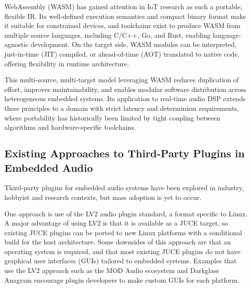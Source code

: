 \documentclass[a4paper]{article}
\begin{document}
WebAssembly (WASM) has gained attention in IoT research as such a portable, flexible IR\cite{10.1007/978-3-030-74296-6_27}\cite{10.1145/3593434.3593454}\cite{Rusum_2022}. Its well-defined execution semantics and compact binary format make it suitable for constrained devices, and toolchains exist to produce WASM from multiple source languages, including C/C++, Go, and Rust, enabling language-agnostic development. On the target side, WASM modules can be interpreted, just-in-time (JIT) compiled, or ahead-of-time (AOT) translated to native code, offering flexibility in runtime architecture.

This multi-source, multi-target model leveraging WASM reduces duplication of effort, improves maintainability, and enables modular software distribution across heterogeneous embedded systems. Its application to real-time audio DSP extends these principles to a domain with strict latency and determinism requirements, where portability has historically been limited by tight coupling between algorithms and hardware-specific toolchains.


\subsection{ Existing Approaches to Third-Party Plugins in Embedded Audio}

Third-party plugins for embedded audio systems have been explored in industry, hobbyist and research contexts, but mass adoption is yet to occur.

One approach is use of the LV2 audio plugin standard, a format specific to Linux. A major advantage of using LV2 is that it is available as a JUCE target, so existing JUCE plugins can be ported to new Linux platforms with a conditional build for the host architecture. Some downsides of this approach are that an operating system is required, and that most existing JUCE plugins do not have graphical user interfaces (GUIs) tailored to embedded systems. Examples that use the LV2 approach such as the MOD Audio ecosystem\cite{mod_audio_platform} and Darkglass Anagram\cite{darkglass_plugin_dev_setup} encourage plugin developers to make custom GUIs for each platform.
\end{document}
